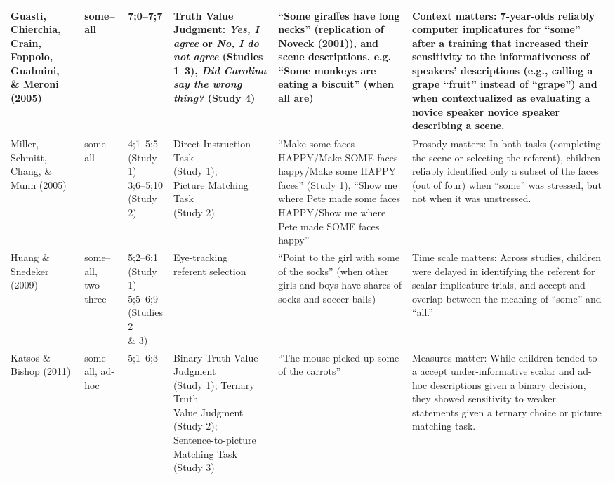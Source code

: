 \documentclass[man]{apa2}
\begin{document}
{\begin{landscape}
\begin{table}[!ht]
\begin{tabular}{| p{2.2cm} | p{2cm} | p{1.69cm} | p{4.5cm} | p{5cm} | p{7.2cm} |}
\parbox[t]{2.2cm}{Guasti, Chierchia, Crain, Foppolo, Gualmini,\\\& Meroni (2005)} & some--all & 7;0--7;7 & Truth Value Judgment: \textit{Yes, I agree} or \textit{No, I do not agree} (Studies 1--3), \textit{Did Carolina say the wrong thing?} (Study 4) & ``Some giraffes have long necks'' (replication of Noveck (2001)), and scene descriptions, e.g. ``Some monkeys are eating a biscuit'' (when all are) & Context matters: 7-year-olds reliably computer implicatures for ``some'' after a training that increased their sensitivity to the informativeness of speakers' descriptions (e.g., calling a grape ``fruit'' instead of ``grape'') and when contextualized as evaluating a novice speaker novice speaker describing a scene.\\ \hline
Miller, Schmitt, Chang, \& Munn (2005) & some--all & \parbox[t]{1.69cm}{4;1--5;5\\(Study 1)\\ 3;6--5;10\\(Study 2)} & \parbox[t]{4.5cm}{Direct Instruction Task\\(Study 1);\\Picture Matching Task\\(Study 2)} & ``Make some faces HAPPY/Make SOME faces happy/Make some HAPPY faces'' (Study 1), ``Show me where Pete made some faces HAPPY/Show me where Pete made SOME faces happy'' & Prosody matters: In both tasks (completing the scene or selecting the referent), children reliably identified only a subset of the faces (out of four) when ``some'' was stressed, but not when it was unstressed.\\ \hline
\parbox[t]{2.2cm}{Huang \&\\Snedeker (2009)} & \parbox[t]{2cm}{some--all,\\two--three} &\parbox[t]{1.69cm}{5;2--6;1\\(Study 1)\\5;5--6;9 \\(Studies 2\\\& 3)} & \parbox[t]{4.5cm}{Eye-tracking\\referent selection} & ``Point to the girl with some of the socks'' (when other girls and boys have shares of socks and soccer balls) & Time scale matters: Across studies, children were delayed in identifying the referent for scalar implicature trials, and accept and overlap between the meaning of ``some'' and ``all.'' \\ \hline
Katsos \& Bishop (2011) & some--all, ad-hoc & 5;1--6;3  & \parbox[t]{4.5cm}{Binary Truth Value Judgment\\(Study 1); Ternary Truth\\Value Judgment (Study 2);\\Sentence-to-picture Matching Task\\(Study 3)} & ``The mouse picked up some of the carrots'' & Measures matter: While children tended to a accept under-informative scalar and ad-hoc descriptions given a binary decision, they showed sensitivity to weaker statements given a ternary choice or picture matching task. \\ \hline

\end{tabular}
\end{table}
\end{landscape}}
\end{document}
